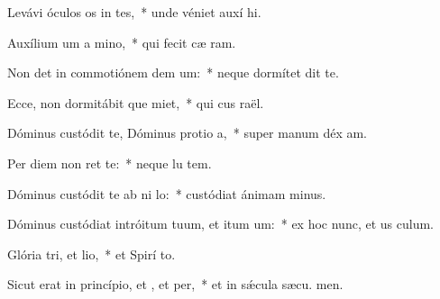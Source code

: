 \item Levávi óculos os in tes,~* unde véniet auxí hi.
\item Auxílium um a mino,~* qui fecit cæ  ram.
\item Non det in commotiónem dem um:~* neque dormítet  dit te.
\item Ecce, non dormitábit que miet,~* qui cus raël.
\item Dóminus custódit te, Dóminus protio a,~* super manum déx am.
\item Per diem  non ret te:~* neque lu  tem.
\item Dóminus custódit te ab ni lo:~* custódiat ánimam  minus.
\item Dóminus custódiat intróitum tuum, et itum um:~* ex hoc nunc, et us  culum.
\item Glória tri, et lio,~* et Spirí to.
\item Sicut erat in princípio, et , et per,~* et in sǽcula sæcu. men.
